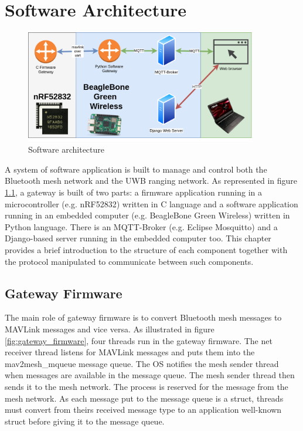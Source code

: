\documentclass[\main/thesis.tex]{subfiles}
\begin{document}
\graphicspath{{img/}{05_software/img/}}

\chapter{Software Architecture}
\begin{figure}[H]
    \begin{center}
        \includegraphics[width=0.9\textwidth]{software_architecture.png}
    \end{center}
    \caption{Software architecture}
    \label{fig:software_architecture}
\end{figure}
A system of software application is built to manage and control both the Bluetooth mesh network and the UWB ranging network. As represented in figure \ref{fig:software_architecture}, a gateway is built of two parts: a firmware application running in a microcontroller (e.g. nRF52832) written in C language and a software application running in an embedded computer (e.g. BeagleBone Green Wireless) written in Python language. There is an  MQTT-Broker (e.g. Eclipse Mosquitto) and a Django-based server running in the embedded computer too. This chapter provides a brief introduction to the structure of each component together with  the protocol manipulated to communicate between such components.

\section{Gateway Firmware}
The main role of gateway firmware is to convert Bluetooth mesh messages to MAVLink messages and vice versa. As illustrated in figure \ref{fig:gateway_firmware}, four threads run in the gateway firmware. The net receiver thread listens for MAVLink messages and puts them into the mav2mesh\_mqueue message queue. The OS notifies the mesh sender thread when messages are available in the message queue. The mesh sender thread then sends it to the mesh network. The process is reserved for the message from the mesh network. As each message put to the message queue is a struct, threads must convert from theirs received message type to an application well-known struct before giving it to the message queue.
\end{document}
